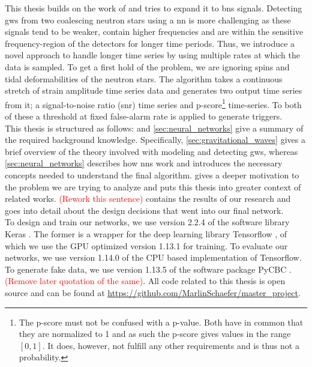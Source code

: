 This thesis builds on the work of \cite{original_deep_filtering} and tries to expand it to \gls{bns} signals. Detecting \gls{gw}s from two coalescing neutron stars using a \gls{nn} is more challenging as these signals tend to be weaker, contain higher frequencies and are within the sensitive frequency-region of the detectors for longer time periods. Thus, we introduce a novel approach to handle longer time series by using multiple rates at which the data is sampled. To get a first hold of the problem, we are ignoring spins and tidal deformabilities of the neutron stars. The algorithm takes a continuous stretch of strain amplitude time series data and generates two output time series from it; a signal-to-noise ratio (\gls{snr}) time series and p-score\footnote{The p-score must not be confused with a p-value. Both have in common that they are normalized to 1 and as such the p-score gives values in the range $\left[0,1\right]$. It does, however, not fulfill any other requirements and is thus not a probability.} time-series. To both of these a threshold at fixed false-alarm rate is applied to generate triggers.\medskip\\
This thesis is structured as follows:  and \autoref{sec:neural_networks} give a summary of the required background knowledge. Specifically, \autoref{sec:gravitational_waves} gives a brief overview of the theory involved with modeling and detecting \gls{gw}s, whereas \autoref{sec:neural_networks} describes how \gls{nn}s work and introduces the necessary concepts needed to understand the final algorithm.  gives a deeper motivation to the problem we are trying to analyze and puts this thesis into greater context of related works. \textcolor{red}{(Rework this sentence)}  contains the results of our research and goes into detail about the design decisions that went into our final network.\medskip\\
To design and train our networks, we use version 2.2.4 of the software library Keras \cite{keras}. The former is a wrapper for the deep learning library Tensorflow \cite{tensorflow}, of which we use the GPU optimized version 1.13.1 for training. To evaluate our networks, we use version 1.14.0 of the CPU based implementation of Tensorflow. To generate fake data, we use version 1.13.5 of the software package PyCBC \cite{pycbc}. \textcolor{red}{(Remove later quotation of the same)}. All code related to this thesis is open source and can be found at \url{https://github.com/MarlinSchaefer/master_project}.
